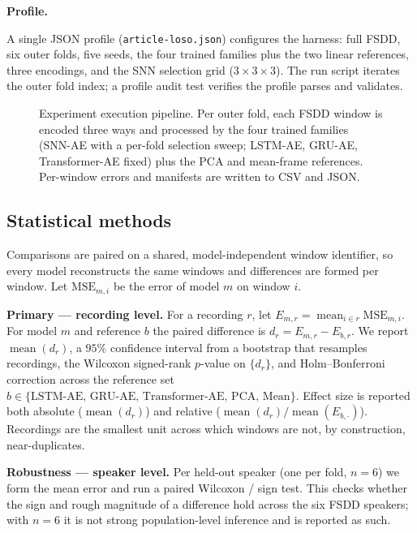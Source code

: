 \documentclass[conference]{IEEEtran}
\begin{document}
\textbf{Profile.}
\par A single JSON profile (\texttt{article-loso.json}) configures the harness:
full FSDD, six outer folds, five seeds, the four trained families plus the two
linear references, three encodings, and the SNN selection grid
($3\times3\times3$). The run script iterates the outer fold index; a profile
audit test verifies the profile parses and validates.

\begin{figure}[!t]
  \centering
  
  \caption{Experiment execution pipeline. Per outer fold, each FSDD window is
  encoded three ways and processed by the four trained families (SNN-AE with a
  per-fold selection sweep; LSTM-AE, GRU-AE, Transformer-AE fixed) plus the PCA
  and mean-frame references. Per-window errors and manifests are written to CSV
  and JSON.}
  \label{fig:flow}
\end{figure}

\subsection{Statistical methods}
\label{sec:stats}

\par Comparisons are paired on a shared, model-independent window identifier, so
every model reconstructs the same windows and differences are formed per window.
Let $\mathrm{MSE}_{m,i}$ be the error of model $m$ on window $i$.

\par \textbf{Primary --- recording level.} For a recording $r$, let
$E_{m,r} = \operatorname{mean}_{i \in r}\mathrm{MSE}_{m,i}$. For model $m$ and
reference $b$ the paired difference is $d_r = E_{m,r} - E_{b,r}$. We report
$\operatorname{mean}(d_r)$, a $95\%$ confidence interval from a bootstrap that
resamples recordings, the Wilcoxon signed-rank $p$-value on $\{d_r\}$, and
Holm--Bonferroni correction across the reference set
$b \in \{\text{LSTM-AE, GRU-AE, Transformer-AE, PCA, Mean}\}$. Effect size is
reported both absolute ($\operatorname{mean}(d_r)$) and relative
($\operatorname{mean}(d_r)/\operatorname{mean}(E_{b,\cdot})$). Recordings are the
smallest unit across which windows are not, by construction, near-duplicates.

\par \textbf{Robustness --- speaker level.} Per held-out speaker (one per fold,
$n=6$) we form the mean error and run a paired Wilcoxon / sign test. This checks
whether the sign and rough magnitude of a difference hold across the six FSDD
speakers; with $n=6$ it is not strong population-level inference and is reported
as such.
\end{document}
